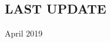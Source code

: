\documentclass[margin]{res} %
\begin{document}
\begin{resume}
\section{LAST UPDATE} 
April 2019

\end{resume}
\end{document}
